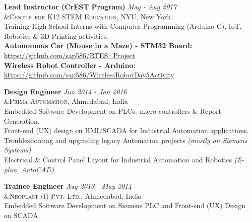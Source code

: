 \documentclass[a4paper,10pt]{article}
\begin{document}
\textbf{Lead Instructor (CrEST Program)} \hfill \emph {May - Aug 2017}\\
 &\textsc{Center for K12 STEM Education, NYU}, New York\\
 \textbullet{} Training High School Interns with Computer Programming (Arduino C), IoT, Robotics \& 3D-Printing activities.\\
 \textbullet{} \textbf{Autonomous Car (Mouse in a Maze) - STM32 Board: } \href{https://github.com/sap586/RTES_Project}{https://github.com/sap586/RTES_Project}\\
 \textbullet{} \textbf{Wireless Robot Controller - Arduino: } \href{https://github.com/sap586/WirelessRobotDay5Activity}{https://github.com/sap586/WirelessRobotDay5Activity}
 
 \textbf{Design Engineer} \hfill \emph {Jun 2014 - Jan 2016}\\
 &\textsc{Prima Automation}, Ahmedabad, India\\
 \textbullet{} Embedded Software Development on PLCs, micro-controllers \& Report Generation.\\
 \textbullet{} Front-end (UX) design on HMI/SCADA for Industrial Automation applications.\\
 \textbullet{} Troubleshooting and upgrading legacy  Automation projects \emph{(mostly on Siemens Systems)}.\\
 \textbullet{} Electrical \& Control Panel Layout for Industrial Automation and Robotics \emph{(E-plan, AutoCAD)}.
 
 \textbf{Trainee Engineer} \hfill \emph {Aug 2013 - May 2014}\\
 &\textsc{Neoplast (I) Pvt. Ltd.}, Ahmedabad, India\\
 \textbullet{} Embedded Software Development on Siemens PLC and Front-end (UX) Design on SCADA.
 
\end{document}
